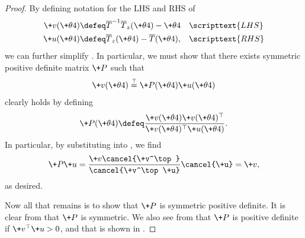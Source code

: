 \documentclass{article} %
\newcommand{\param}{\+\theta}
\newcommand{\transformationMatrixGradientToEMStep}{\+P}
\begin{document}
\begin{proof}
By defining notation for the LHS and RHS of 
%
\begin{align}
\+v(\param^^t)& \defeq \overline{T}^{-1} \overline{T}_z(\param^^t) - \param^^t && \scripttext{LHS} \\
\+u(\param^^t)& \defeq \overline{T}_z(\param^^t)  - 	\overline{T}(\param^^t), && \scripttext{RHS}
\end{align}
%
we can further simplify .  In particular, we must show that there exists symmetric positive definite matrix $\transformationMatrixGradientToEMStep$ such that
%
\begin{align}
\+v(\param^^t) \stackrel{?}{=} \transformationMatrixGradientToEMStep(\param^^t)  \+u(\param^^t)
\label{eqn:relating_the_EM_step_to_the_ordinary_gradient__VERY_compact_notation}
\end{align}
%
 clearly holds by defining
%
\begin{align}
\transformationMatrixGradientToEMStep(\param^^t) \defeq  \frac{\+v(\param^^t) \+v(\param^^t)^\top}{\+v(\param^^t)^\top \+u(\param^^t)}.
\label{eqn:solution_to_transformation_matrix_relating_the_EM_step_to_the_ordinary_gradient__VERY_compact_notation} 
\end{align}
%
In particular, by substituting   into , we find 
%
\begin{align}
\transformationMatrixGradientToEMStep \+u =  \frac{\+v \cancel{\+v^\top}}{\cancel{\+v^\top \+u}} \cancel{\+u} = \+v,
\end{align}
%
as desired.  

Now all that remains is to show that $\transformationMatrixGradientToEMStep$ is symmetric positive definite.  It is clear from  that $\transformationMatrixGradientToEMStep$ is symmetric.  We also see from  that $\transformationMatrixGradientToEMStep$ is positive definite if $\+v^\top \+u >0$, and that is shown in \citet[Eqn.~26]{salakhutdinov2002relationship}.
\end{proof}
\end{document}
